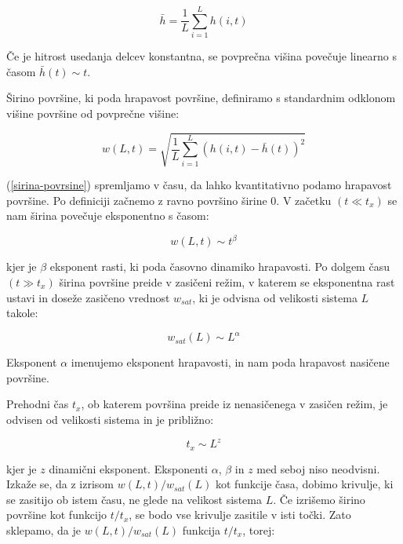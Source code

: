 \documentclass[a4paper, twoside, 12pt]{book}
\begin{document}
  \begin{equation}
    \bar{h} = \frac{1}{L} \sum_{i=1}^L h(i,t)
    \label{povprecna-visina}
  \end{equation}

  Če je hitrost usedanja delcev konstantna, se povprečna višina povečuje linearno s časom $\bar{h}(t) \sim t$.

  Širino površine, ki poda hrapavost površine, definiramo s standardnim odklonom višine površine od povprečne višine:

  \begin{equation}
    w(L,t) = \sqrt{\frac{1}{L} \sum_{i=1}^L (h(i,t)-\bar{h}(t))^2}
    \label{sirina-povrsine}
  \end{equation}

  (\ref{sirina-povrsine}) spremljamo v času, da lahko kvantitativno podamo hrapavost površine. Po definiciji začnemo z ravno površino širine 0. V začetku $(t \ll t_x)$ se nam širina povečuje eksponentno s časom:

  \begin{equation}
    w(L,t) \sim t^\beta
    \label{beta}
  \end{equation}

  kjer je $\beta$ eksponent rasti, ki poda časovno dinamiko hrapavosti.
  Po dolgem času $(t \gg t_x)$ širina površine preide v zasičeni režim, v katerem se eksponentna rast ustavi in doseže zasičeno vrednost $w_{sat}$, ki je odvisna od velikosti sistema $L$ takole:

  \begin{equation}
    w_{sat}(L) \sim L^\alpha
    \label{alfa}
  \end{equation}

  Eksponent $\alpha$ imenujemo eksponent hrapavosti, in nam poda hrapavost nasičene površine.

  Prehodni čas $t_x$, ob katerem površina preide iz nenasičenega v zasičen režim, je odvisen od velikosti sistema in je približno:

  \begin{equation}
    t_x \sim L^z
    \label{z}
  \end{equation}

  kjer je $z$ dinamični eksponent.
  Eksponenti $\alpha$, $\beta$ in $z$ med seboj niso neodvisni.
  Izkaže se, da z izrisom $w(L,t)/w_{sat}(L)$ kot funkcije časa, dobimo krivulje, ki se zasitijo ob istem času, ne glede na velikost sistema $L$.
  Če izrišemo širino površine kot funkcijo $t/t_x$, se bodo vse krivulje zasitile v isti točki.
  Zato sklepamo, da je $w(L,t)/w_{sat}(L)$ funkcija $t/t_x$, torej:
\end{document}
